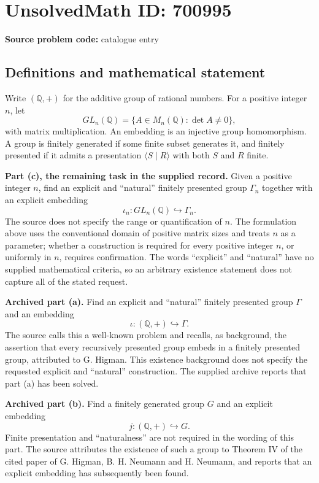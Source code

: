 \documentclass[11pt]{article}
\newcommand{\Q}{\mathbb{Q}}
\begin{document}
\section*{UnsolvedMath ID: 700995}
\textbf{Source problem code:} catalogue entry
\subsection{Definitions and mathematical statement}
Write $(\Q,+)$ for the additive group of rational numbers. For a positive integer $n$, let
\[
GL_n(\Q)=\{A\in M_n(\Q):\det A\ne 0\},
\]
with matrix multiplication. An embedding is an injective group homomorphism. A group is finitely generated if some finite subset generates it, and finitely presented if it admits a presentation $\langle S\mid R\rangle$ with both $S$ and $R$ finite.

\textbf{Part (c), the remaining task in the supplied record.} Given a positive integer $n$, find an explicit and ``natural'' finitely presented group $\Gamma_n$ together with an explicit embedding
\[
\iota_n:GL_n(\Q)\hookrightarrow\Gamma_n.
\]
The source does not specify the range or quantification of $n$. The formulation above uses the conventional domain of positive matrix sizes and treats $n$ as a parameter; whether a construction is required for every positive integer $n$, or uniformly in $n$, requires confirmation. The words ``explicit'' and ``natural'' have no supplied mathematical criteria, so an arbitrary existence statement does not capture all of the stated request.

\textbf{Archived part (a).} Find an explicit and ``natural'' finitely presented group $\Gamma$ and an embedding
\[
\iota:(\Q,+)\hookrightarrow\Gamma.
\]
The source calls this a well-known problem and recalls, as background, the assertion that every recursively presented group embeds in a finitely presented group, attributed to G. Higman. This existence background does not specify the requested explicit and ``natural'' construction. The supplied archive reports that part (a) has been solved.

\textbf{Archived part (b).} Find a finitely generated group $G$ and an explicit embedding
\[
 j:(\Q,+)\hookrightarrow G.
\]
Finite presentation and ``naturalness'' are not required in the wording of this part. The source attributes the existence of such a group to Theorem IV of the cited paper of G. Higman, B. H. Neumann and H. Neumann, and reports that an explicit embedding has subsequently been found.
\end{document}
